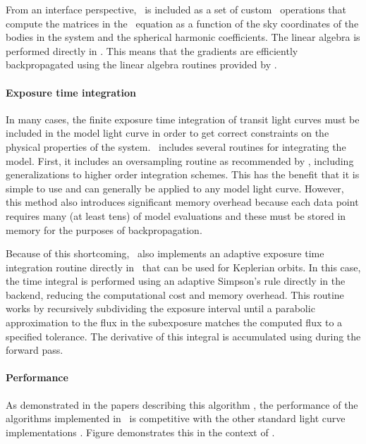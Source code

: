 \documentclass[modern]{aastex62}
\begin{document}
From an interface perspective, \starry\ is included as a set of custom \theano\ operations that compute the matrices in the \starry\ equation as a function of the sky coordinates of the bodies in the system and the spherical harmonic coefficients.
The linear algebra is performed directly in \theano.
This means that the gradients are efficiently backpropagated using the linear algebra routines provided by \theano.

\paragraph{Exposure time integration}
In many cases, the finite exposure time integration of transit light curves must be included in the model light curve in order to get correct constraints on the physical properties of the system.
\exoplanet\ includes several routines for integrating the model.
First, it includes an oversampling routine as recommended by , including generalizations to higher order integration schemes.
This has the benefit that it is simple to use and can generally be applied to any model light curve.
However, this method also introduces significant memory overhead because each data point requires many (at least tens) of model evaluations and these must be stored in memory for the purposes of backpropagation.

Because of this shortcoming, \exoplanet\ also implements an adaptive exposure time integration routine directly in \cpp\ that can be used for Keplerian orbits.
In this case, the time integral is performed using an adaptive Simpson's rule  directly in the backend, reducing the computational cost and memory overhead.
This routine works by recursively subdividing the exposure interval until a parabolic approximation to the flux in the subexposure matches the computed flux to a specified tolerance.
The derivative of this integral is accumulated using during the forward pass.

\paragraph{Performance}
As demonstrated in the papers describing this algorithm \citep{Luger:2019} , the performance of the algorithms implemented in \starry\ is competitive with the other standard light curve implementations .
Figure  demonstrates this in the context of \exoplanet.
\end{document}
